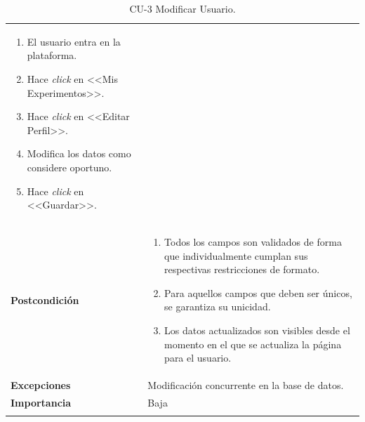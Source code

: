 \begin{longtable}[H]{@{}ll@{}}
\begin{minipage}[t]{0.71\columnwidth}
\begin{enumerate}
\def\labelenumi{\arabic{enumi}.}
\tightlist
\item El usuario entra en la plataforma.
\item Hace \textit{click} en <<Mis Experimentos>>.
\item Hace \textit{click} en <<Editar Perfil>>.
\item Modifica los datos como considere oportuno.
\item Hace \textit{click} en <<Guardar>>.
\end{enumerate}\strut
\end{minipage}\tabularnewline
\begin{minipage}[t]{0.23\columnwidth}\raggedright\strut
\textbf{Postcondición}\strut
\end{minipage} & \begin{minipage}[t]{0.71\columnwidth}\raggedright\strut
\begin{enumerate}
\tightlist
\item Todos los campos son validados de forma que individualmente cumplan sus respectivas restricciones de formato.
\item Para aquellos campos que deben ser únicos, se garantiza su unicidad.
\item Los datos actualizados son visibles desde el momento en el que se actualiza la página para el usuario.
\end{enumerate}\strut
\end{minipage}\tabularnewline
\begin{minipage}[t]{0.23\columnwidth}\raggedright\strut
\textbf{Excepciones}\strut
\end{minipage} & \begin{minipage}[t]{0.71\columnwidth}\raggedright\strut
Modificación concurrente en la base de datos.\strut
\end{minipage}\tabularnewline
\begin{minipage}[t]{0.23\columnwidth}\raggedright\strut
\textbf{Importancia}\strut
\end{minipage} & \begin{minipage}[t]{0.71\columnwidth}\raggedright\strut
Baja\strut
\end{minipage}\tabularnewline
\bottomrule
\caption{CU-3 Modificar Usuario.}
\end{longtable}

